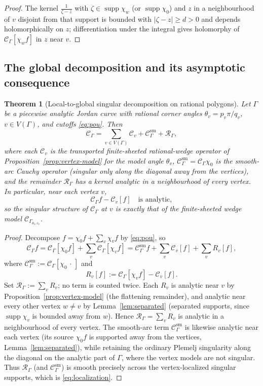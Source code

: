 \documentclass[pdflatex,sn-mathphys-num]{sn-jnl}%
\newcommand{\Cau}{\mathcal{C}}
\theoremstyle{thmstyleone}
\newtheorem{theorem}{Theorem}
\theoremstyle{thmstyletwo}
\theoremstyle{thmstylethree}
\begin{document}
\begin{proof}
The kernel $\frac{1}{\zeta-z}$ with $\zeta\in\operatorname{supp}\chi_w$ (or
$\operatorname{supp}\chi_0$) and $z$ in a neighbourhood of $v$ disjoint from that
support is bounded with $|\zeta-z|\ge d>0$ and depends holomorphically on $z$;
differentiation under the integral gives holomorphy of $\Cau_\Gamma[\chi_w f]$
in $z$ near $v$.
\end{proof}

\subsection{The global decomposition and its asymptotic consequence}

\begin{theorem}[Local-to-global singular decomposition on rational polygons]
\label{thm:localization}
Let $\Gamma$ be a piecewise analytic Jordan curve with rational corner angles
$\theta_v=p_v\pi/q_v$, $v\in V(\Gamma)$, and cutoffs \eqref{eq:pou}. Then
\begin{equation}\label{eq:localization}
  \Cau_\Gamma
  =\sum_{v\in V(\Gamma)}\Cau_v
   +\Cau_\Gamma^{\mathrm{sm}}
   +\mathcal R_\Gamma,
\end{equation}
where each $\Cau_v$ is the transported finite-sheeted rational-wedge operator of
Proposition~\ref{prop:vertex-model} for the model angle $\theta_v$,
$\Cau_\Gamma^{\mathrm{sm}}=\Cau_\Gamma\chi_0$ is the smooth-arc Cauchy operator
(singular only along the diagonal away from the vertices), and the remainder
$\mathcal R_\Gamma$ has a kernel analytic in a neighbourhood of every vertex. In
particular, near each vertex $v$,
\[
  \Cau_\Gamma f-\Cau_v[f]\quad\text{is analytic},
\]
so the singular structure of $\Cau_\Gamma$ at $v$ is exactly that of the
finite-sheeted wedge model $\Cau_{\Gamma_{\theta_v,c_v}}$.
\end{theorem}

\begin{proof}
Decompose $f=\chi_0 f+\sum_v\chi_v f$ by \eqref{eq:pou}, so
\[
  \Cau_\Gamma f
  =\Cau_\Gamma[\chi_0 f]+\sum_v\Cau_\Gamma[\chi_v f]
  =\Cau_\Gamma^{\mathrm{sm}}f+\sum_v\Cau_v[f]+\sum_v R_v[f],
\]
where $\Cau_\Gamma^{\mathrm{sm}}:=\Cau_\Gamma[\chi_0\,\cdot\,]$ and
\[
  R_v[f]:=\Cau_\Gamma[\chi_v f]-\Cau_v[f].
\]
Set $\mathcal R_\Gamma:=\sum_v R_v$; no term is counted twice. Each $R_v$ is
analytic near $v$ by Proposition~\ref{prop:vertex-model} (the flattening
remainder), and analytic near every other vertex $w\neq v$ by
Lemma~\ref{lem:separated} (separated supports, since $\operatorname{supp}\chi_v$
is bounded away from $w$). Hence $\mathcal R_\Gamma=\sum_v R_v$ is analytic in a
neighbourhood of every vertex. The smooth-arc term $\Cau_\Gamma^{\mathrm{sm}}$ is
likewise analytic near each vertex (its source $\chi_0 f$ is supported away from
the vertices, Lemma~\ref{lem:separated}), while retaining the ordinary Plemelj
singularity along the diagonal on the analytic part of $\Gamma$, where the
vertex models are not singular. Thus $\mathcal R_\Gamma$ (and
$\Cau_\Gamma^{\mathrm{sm}}$) is smooth precisely across the vertex-localized
singular supports, which is \eqref{eq:localization}.
\end{proof}
\end{document}
